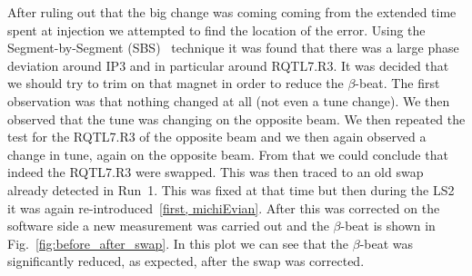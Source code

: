 \documentclass[a4paper]{cernatsnote}
\begin{document}
After ruling out that the big change was coming coming from the extended time spent at injection we attempted to find the location of the error. Using the Segment-by-Segment (SBS)~\cite{first} technique it was found that there was a large phase deviation around IP3 and in particular around RQTL7.R3. It was decided that we should try to trim on that magnet in order to reduce the $\beta$-beat. The first observation was that nothing changed at all (not even a tune change). We then observed that the tune was changing on the opposite beam. We then repeated the test for the RQTL7.R3 of the opposite beam and we then again observed a change in tune, again on the opposite beam. From that we could conclude that indeed the RQTL7.R3 were swapped. This was then traced to an old swap already detected in Run~1. This was fixed at that time but then during the LS2 it was again re-introduced~\ref{first, michiEvian}. After this was corrected on the software side a new measurement was carried out and the $\beta$-beat is shown in Fig.~\ref{fig:before_after_swap}. In this plot we can see that the $\beta$-beat was significantly reduced, as expected, after the swap was corrected.  
\end{document}
